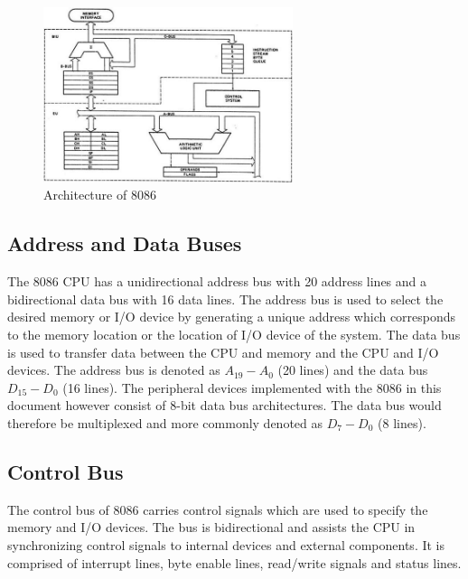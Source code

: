         \begin{figure}[ht]
            \begin{center}
                \includegraphics[width=0.65\textwidth]{figures/02_8086_architecture.jpg}
                \caption{Architecture of 8086} \label{fig:8086_architecture}
            \end{center}
        \end{figure}

    \subsection{Address and Data Buses}
    The 8086 CPU has a unidirectional address bus with 20 address lines and a bidirectional data bus with 16 data lines. \cite{buses} The address bus is used to select the desired memory or I/O device by generating a unique address which corresponds to the memory location or the location of I/O device of the system. The data bus is used to transfer data between the CPU and memory and the CPU and I/O devices.\n
    The address bus is denoted as $A_{19}-A_{0}$ (20 lines) and the data bus $D_{15}-D_{0}$ (16 lines). The peripheral devices implemented with the 8086 in this document however consist of 8-bit data bus architectures. The data bus would therefore be multiplexed and more commonly denoted as $D_{7}-D_{0}$ (8 lines).

    \subsection{Control Bus}
    The control bus of 8086 carries control signals which are used to specify the memory and I/O devices. \cite{buses} The bus is bidirectional and assists the CPU in synchronizing control signals to internal devices and external components. It is comprised of interrupt lines, byte enable lines, read/write signals and status lines.
